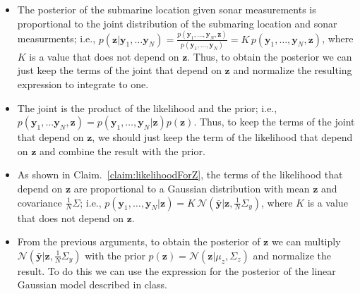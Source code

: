 \documentclass[12pt]{article}
\begin{document}
\begin{enumerate}[(a)]
\begin{itemize}
                \item The posterior of the submarine location given sonar
                    measurements is proportional to the joint distribution of
                    the submaring location and sonar measurments; i.e.,
                    $p(\mathbf{z}|\mathbf{y}_1,\ldots\mathbf{y}_N)=\frac{p(\mathbf{y}_1,\ldots,\mathbf{y}_N,\mathbf{z})}{p(\mathbf{y}_1,\ldots,\mathbf{y}_N)}=K\,p(\mathbf{y}_1,\ldots,\mathbf{y}_N,\mathbf{z})$,
                    where $K$ is a value that does not depend on $\mathbf{z}$. Thus, to
                    obtain the posterior we can just keep the terms of the
                    joint that depend on $\mathbf{z}$ and normalize the
                    resulting expression to integrate to one.

                \item The joint is the product of the likelihood and the prior;
                    i.e.,
                    $p(\mathbf{y}_1,\ldots\mathbf{y}_N,\mathbf{z})=p(\mathbf{y}_1,\ldots,\mathbf{y}_N|\mathbf{z})p(\mathbf{z})$.
                    Thus, to keep the terms of the joint that depend on
                    $\mathbf{z}$, we should just keep the term of the
                    likelihood that depend on $\mathbf{z}$ and combine the
                    result with the prior.

                \item As shown in Claim.~\ref{claim:likelihoodForZ}, the terms of the
                    likelihood that depend on $\mathbf{z}$ are proportional to
                    a Gaussian distribution with mean $\mathbf{z}$ and
                    covariance $\frac{1}{N}\Sigma$; i.e., 
                    $p(\mathbf{y}_1,\ldots,\mathbf{y}_N|\mathbf{z})=K\,\mathcal{N}(\bar{\mathbf{y}}|\mathbf{z},\frac{1}{N}\Sigma_y)$,
                    where $K$ is a value that does not depend on $\mathbf{z}$.

                \item From the previous arguments, to obtain the posterior of
                    $\mathbf{z}$ we can multiply
                    $\mathcal{N}(\bar{\mathbf{y}}|\mathbf{z},\frac{1}{N}\Sigma_y)$
                    with the prior
                    $p(\mathbf{z})=\mathcal{N}(\mathbf{z}|\mu_z,\Sigma_z)$ and
                    normalize the result. To do this we can use the expression
                    for the posterior of the linear Gaussian model described in
                    class.

            \end{itemize}


\end{enumerate}
\end{document}
